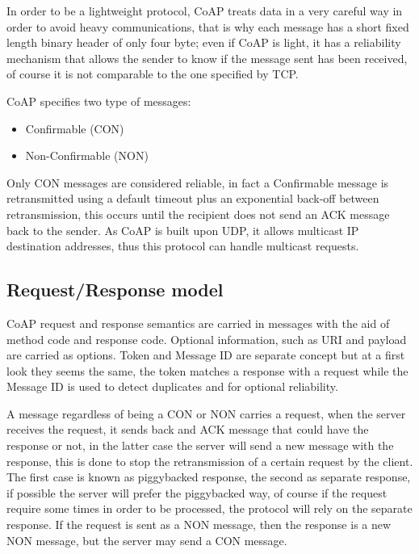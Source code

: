 	In order to be a lightweight protocol, CoAP treats data in a very careful way in order to avoid heavy communications, that is why each message has a short fixed length binary header of only four byte; even if CoAP is light, it has a reliability mechanism that allows the sender to know if the message sent has been received, of course it is not comparable to the one specified by TCP.\newline
	
	CoAP specifies two type of messages:
	\begin{itemize}
		\item Confirmable (CON)
		\item Non-Confirmable (NON)
	\end{itemize}
	Only CON messages are considered reliable, in fact a Confirmable message is retransmitted using a default timeout plus an exponential back-off between retransmission, this occurs until the recipient does not send an ACK message back to the sender.\newline
	As CoAP is built upon UDP, it allows multicast IP destination addresses, thus this protocol can handle multicast requests.\newline
	
	\subsection{Request/Response model}
	CoAP request and response semantics are carried in messages with the aid of method code and response code.\newline
	Optional information, such as URI and payload are carried as options.\newline
	Token and Message ID are separate concept but at a first look they seems the same, the token matches a response
	with a request while the Message ID is used to detect duplicates and for optional reliability.\newline
	
	A message regardless of being a CON or NON carries a request, when the server receives the request, it sends back and ACK message that could have the response or not, in the latter case the server will
	send a new message with the response, this is done to stop the retransmission of a certain request by the client.\newline
	The first case is known as piggybacked response, the second as separate response, if possible the server will prefer the piggybacked way, of course if the request require some times in order to be processed, the protocol will rely on the separate response.\newline
	If the request is sent as a NON message, then the response is a new NON message, but the server may send a CON message.\newline
	
